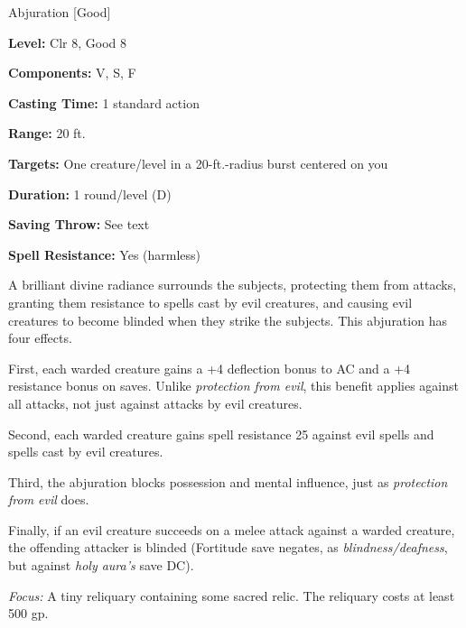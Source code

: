 
Abjuration [Good]

\textbf{Level:} Clr 8, Good 8

\textbf{Components:} V, S, F

\textbf{Casting Time:} 1 standard action

\textbf{Range:} 20 ft.

\textbf{Targets:} One creature/level in a 20-ft.-radius burst centered on you

\textbf{Duration:} 1 round/level (D)

\textbf{Saving Throw:} See text

\textbf{Spell Resistance:} Yes (harmless)

A brilliant divine radiance surrounds the subjects, protecting them from attacks, 
granting them resistance to spells cast by evil creatures, and causing evil creatures 
to become blinded when they strike the subjects. This abjuration has four effects.

First, each warded creature gains a +4 deflection bonus to AC and a +4 resistance 
bonus on saves. Unlike \textit{protection from evil}, this benefit applies against 
all attacks, not just against attacks by evil creatures.

Second, each warded creature gains spell resistance 25 against evil spells and 
spells cast by evil creatures.

Third, the abjuration blocks possession and mental influence, just as \textit{protection 
from evil} does.

Finally, if an evil creature succeeds on a melee attack against a warded creature, 
the offending attacker is blinded (Fortitude save negates, as \textit{blindness/deafness}, 
but against \textit{holy aura's} save DC).

\textit{Focus:} A tiny reliquary containing some sacred relic. The reliquary costs 
at least 500 gp.

